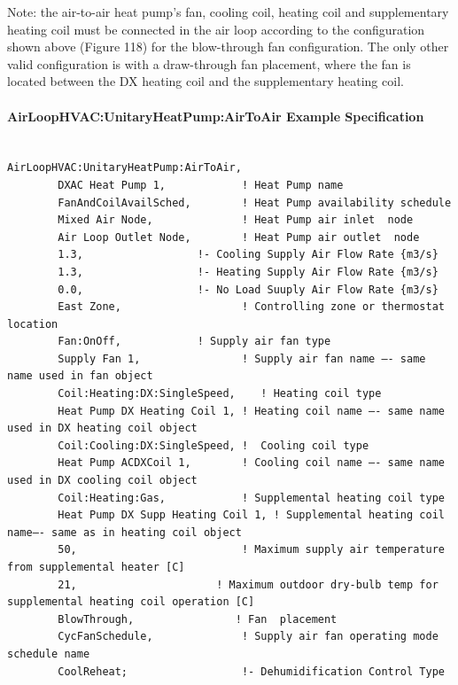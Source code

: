 Note: the air-to-air heat pump's fan, cooling coil, heating coil and supplementary heating coil must be connected in the air loop according to the configuration shown above (Figure 118) for the blow-through fan configuration. The only other valid configuration is with a draw-through fan placement, where the fan is located between the DX heating coil and the supplementary heating coil.

\paragraph{AirLoopHVAC:UnitaryHeatPump:AirToAir Example Specification}\label{airloophvacunitaryheatpumpairtoair-example-specification}

\begin{lstlisting}

AirLoopHVAC:UnitaryHeatPump:AirToAir,
        DXAC Heat Pump 1,            ! Heat Pump name
        FanAndCoilAvailSched,        ! Heat Pump availability schedule
        Mixed Air Node,              ! Heat Pump air inlet  node
        Air Loop Outlet Node,        ! Heat Pump air outlet  node
        1.3,                  !- Cooling Supply Air Flow Rate {m3/s}
        1.3,                  !- Heating Supply Air Flow Rate {m3/s}
        0.0,                  !- No Load Suuply Air Flow Rate {m3/s}
        East Zone,                   ! Controlling zone or thermostat location
        Fan:OnOff,            ! Supply air fan type
        Supply Fan 1,                ! Supply air fan name –- same name used in fan object
        Coil:Heating:DX:SingleSpeed,    ! Heating coil type
        Heat Pump DX Heating Coil 1, ! Heating coil name –- same name used in DX heating coil object
        Coil:Cooling:DX:SingleSpeed, !  Cooling coil type
        Heat Pump ACDXCoil 1,        ! Cooling coil name –- same name used in DX cooling coil object
        Coil:Heating:Gas,            ! Supplemental heating coil type
        Heat Pump DX Supp Heating Coil 1, ! Supplemental heating coil name–- same as in heating coil object
        50,                          ! Maximum supply air temperature from supplemental heater [C]
        21,                      ! Maximum outdoor dry-bulb temp for supplemental heating coil operation [C]
        BlowThrough,                ! Fan  placement
        CycFanSchedule,              ! Supply air fan operating mode schedule name
        CoolReheat;                  !- Dehumidification Control Type


\end{lstlisting}
